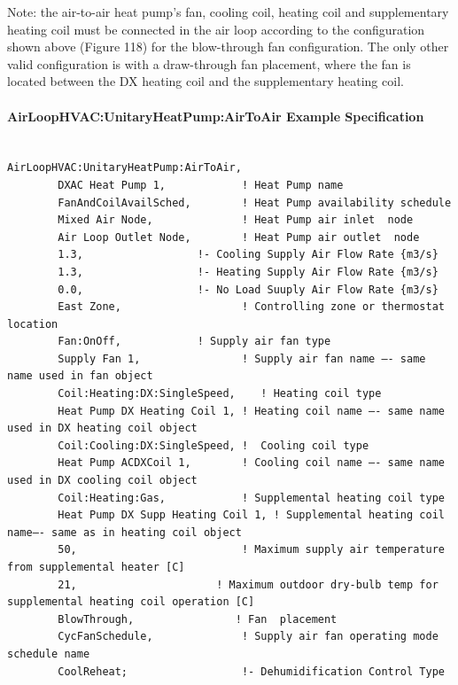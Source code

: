 Note: the air-to-air heat pump's fan, cooling coil, heating coil and supplementary heating coil must be connected in the air loop according to the configuration shown above (Figure 118) for the blow-through fan configuration. The only other valid configuration is with a draw-through fan placement, where the fan is located between the DX heating coil and the supplementary heating coil.

\paragraph{AirLoopHVAC:UnitaryHeatPump:AirToAir Example Specification}\label{airloophvacunitaryheatpumpairtoair-example-specification}

\begin{lstlisting}

AirLoopHVAC:UnitaryHeatPump:AirToAir,
        DXAC Heat Pump 1,            ! Heat Pump name
        FanAndCoilAvailSched,        ! Heat Pump availability schedule
        Mixed Air Node,              ! Heat Pump air inlet  node
        Air Loop Outlet Node,        ! Heat Pump air outlet  node
        1.3,                  !- Cooling Supply Air Flow Rate {m3/s}
        1.3,                  !- Heating Supply Air Flow Rate {m3/s}
        0.0,                  !- No Load Suuply Air Flow Rate {m3/s}
        East Zone,                   ! Controlling zone or thermostat location
        Fan:OnOff,            ! Supply air fan type
        Supply Fan 1,                ! Supply air fan name –- same name used in fan object
        Coil:Heating:DX:SingleSpeed,    ! Heating coil type
        Heat Pump DX Heating Coil 1, ! Heating coil name –- same name used in DX heating coil object
        Coil:Cooling:DX:SingleSpeed, !  Cooling coil type
        Heat Pump ACDXCoil 1,        ! Cooling coil name –- same name used in DX cooling coil object
        Coil:Heating:Gas,            ! Supplemental heating coil type
        Heat Pump DX Supp Heating Coil 1, ! Supplemental heating coil name–- same as in heating coil object
        50,                          ! Maximum supply air temperature from supplemental heater [C]
        21,                      ! Maximum outdoor dry-bulb temp for supplemental heating coil operation [C]
        BlowThrough,                ! Fan  placement
        CycFanSchedule,              ! Supply air fan operating mode schedule name
        CoolReheat;                  !- Dehumidification Control Type


\end{lstlisting}
